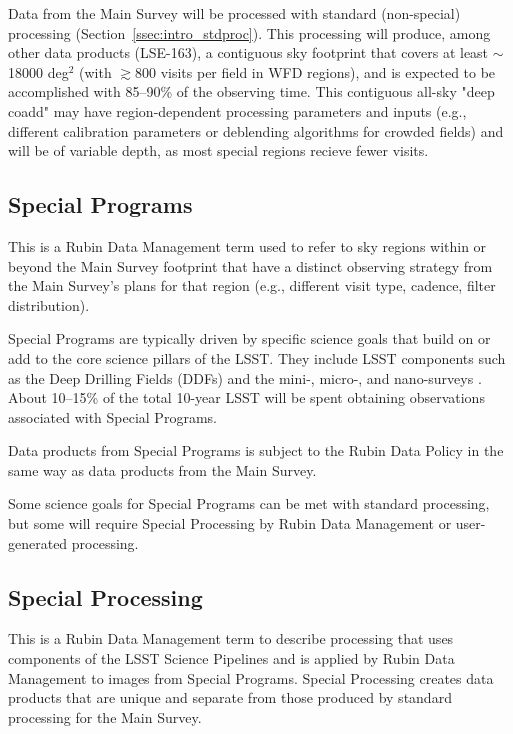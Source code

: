 Data from the Main Survey will be processed with standard (non-special) processing (Section~\ref{ssec:intro_stdproc}).
This processing will produce, among other data products (LSE-163), 
a contiguous sky footprint that covers at 
least $\sim$18000 deg$^2$ (with $\gtrsim$800 visits per field in WFD regions), 
and is expected to be accomplished with 85--90\% of the observing time.
This contiguous all-sky "deep coadd" may have region-dependent processing parameters and inputs
(e.g., different calibration parameters or deblending algorithms for crowded fields)
and will be of variable depth, as most special regions recieve fewer visits.

\subsection{Special Programs} 

This is a Rubin Data Management term used to refer to sky regions within
or beyond the Main Survey footprint that have a distinct observing strategy from
the Main Survey's plans for that region (e.g., different visit type, cadence, filter distribution).

Special Programs are typically driven by specific science goals that build on or 
add to the core science pillars of the LSST.
They include LSST components such as the Deep Drilling 
Fields (DDFs) and the mini-, micro-, and nano-surveys .
About 10--15\% of the total 10-year LSST will be spent obtaining 
observations associated with Special Programs.

Data products from Special Programs is subject to the Rubin Data Policy 
in the same way as data products from the Main Survey.

Some science goals for Special Programs can be met with standard processing,
but some will require Special Processing by Rubin Data Management or user-generated processing.

\subsection{Special Processing}

This is a Rubin Data Management term to describe processing that 
uses components of the LSST Science Pipelines and is applied by Rubin
Data Management to images from Special Programs.
Special Processing creates data products that are unique and separate from those produced
by standard processing for the Main Survey.

